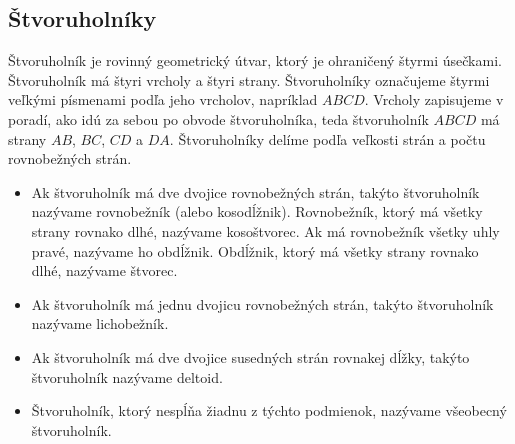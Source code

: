\documentclass{article}
\begin{document}
\subsection{Štvoruholníky}

Štvoruholník je rovinný geometrický útvar, ktorý je ohraničený štyrmi úsečkami. Štvoruholník má štyri vrcholy a štyri strany. Štvoruholníky označujeme štyrmi veľkými písmenami podľa jeho vrcholov, napríklad \(ABCD\). Vrcholy zapisujeme v poradí, ako idú za sebou po obvode štvoruholníka, teda štvoruholník \(ABCD\) má strany \(AB\), \(BC\), \(CD\) a \(DA\). Štvoruholníky delíme podľa veľkosti strán a počtu rovnobežných strán.
\begin{itemize}
  \item Ak štvoruholník má dve dvojice rovnobežných strán, takýto štvoruholník nazývame rovnobežník (alebo kosodĺžnik). Rovnobežník, ktorý má všetky strany rovnako dlhé, nazývame kosoštvorec. Ak má rovnobežník všetky uhly pravé, nazývame ho obdĺžnik. Obdĺžnik, ktorý má všetky strany rovnako dlhé, nazývame štvorec.
  \item Ak štvoruholník má jednu dvojicu rovnobežných strán, takýto štvoruholník nazývame lichobežník.
  \item Ak štvoruholník má dve dvojice susedných strán rovnakej dĺžky, takýto štvoruholník nazývame deltoid.
  \item Štvoruholník, ktorý nespĺňa žiadnu z týchto podmienok, nazývame všeobecný štvoruholník.
\end{itemize}
\end{document}
